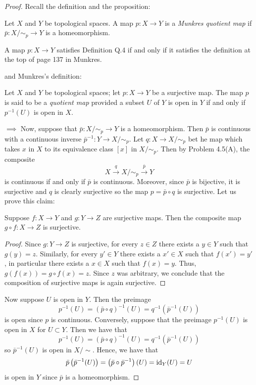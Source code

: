 \begin{proof}
Recall the definition and the proposition:
\begin{definition*}
Let $X$ and $Y$ be topological spaces. A map $p\colon X\to Y$ is
a \emph{Munkres quotient map} if $\bar p\colon X/{\sim_p}\to Y$
is a homeomorphism.
\end{definition*}
\begin{proposition*}[Proposition Q.5]
A map $p\colon X\to Y$ satisfies Definition Q.4 if and only if it
satisfies the definition at the top of page 137 in Munkres.
\end{proposition*}
and Munkres's definition:
\begin{definition*}[Munkres \S22, p.\,137]
Let $X$ and $Y$ be topological spaces; let $p\colon X\to Y$ be a
surjective map. The map $p$ is said to be a \emph{quotient map}
provided a subset $U$ of $Y$ is open in $Y$ if and only if
$p^{-1}(U)$ is open in $X$.
\end{definition*}
$\implies$ Now, suppose that $\bar p\colon X/{\sim_p}\to Y$ is a
homeomorphism. Then $\bar p$ is continuous with a continuous
inverse $\bar p^{-1}\colon Y\to X/{\sim_p}$. Let $q\colon X\to
X/{\sim_p}$ bet he map which takes $x$ in $X$ to its equivalence
class $[x]$ in $X/{\sim_p}$. Then by Problem 4.5(A), the composite
\[
X\overset{q}{\longrightarrow}X/{\sim_p}\overset{\bar p}{\longrightarrow}Y
\]
is continuous if and only if $\bar p$ is continuous. Moreover,
since $\bar p$ is bijective, it is surjective and $q$ is clearly
surjective so the map $p=\bar p\circ q$ is surjective. Let us
prove this claim:
\begin{lemma}
Suppose $f\colon X\to Y$ and $g\colon Y\to Z$ are surjective
maps. Then the composite map $g\circ f\colon X\to Z$ is surjective.
\end{lemma}
\begin{proof}
\renewcommand\qedsymbol{$\clubsuit$}
Since $g\colon Y\to Z$ is surjective, for every $z\in Z$ there
exists a $y\in Y$ such that $g(y)=z$. Similarly, for every $y'\in
Y$ there exists a $x'\in X$ such that $f(x')=y'$, in particular
there exists a $x\in X$ such that $f(x)=y$. Thus, $g(f(x))=g\circ
f(x)=z$. Since $z$ was arbitrary, we conclude that the
composition of surjective maps is again surjective.
\end{proof}
Now suppose $U$ is open in $Y$. Then the preimage
\[
p^{-1}(U)=(\bar p\circ q)^{-1}(U)=q^{-1}\left(\bar p^{-1}(U)\right)
\]
is open since $p$ is continuous. Conversely, suppose that the
preimage $p^{-1}(U)$ is open in $X$ for $U\subset Y$. Then we
have that
\[
p^{-1}(U)=(\bar p\circ q)^{-1}(U)=q^{-1}\left(\bar p^{-1}(U)\right)
\]
so $\bar p^{-1}(U)$ is open in $X/{\sim}$. Hence, we have that
\[
\bar p\left(\bar p^{-1}(U)\right)
=\left(\bar p\circ\bar p^{-1}\right)(U)
=\operatorname{id}_Y(U)
=U
\]
is open in $Y$ since $\bar p$ is a homeomorphism.


\end{proof}
